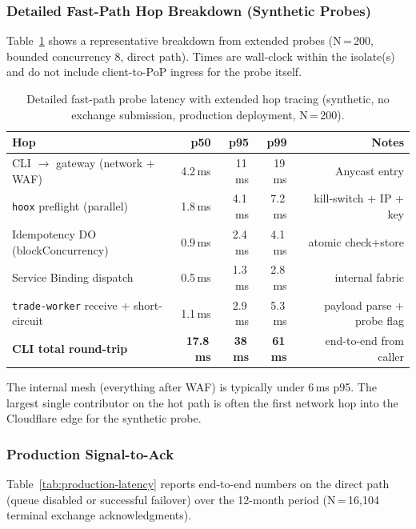 \subsubsection{Detailed Fast-Path Hop Breakdown (Synthetic Probes)}

Table~\ref{tab:fastpath-detailed} shows a representative breakdown from extended probes (N\,=\,200, bounded concurrency 8, direct path). Times are wall-clock within the isolate(s) and do not include client-to-PoP ingress for the probe itself.

\begin{table}[t]
  \centering
  \caption{Detailed fast-path probe latency with extended hop tracing (synthetic, no exchange submission, production deployment, N\,=\,200).}
  \label{tab:fastpath-detailed}
  \small
  \begin{tabular*}{\linewidth}{@{\extracolsep{\fill}}lrrrr@{}}
    \toprule
    \textbf{Hop} & \textbf{p50} & \textbf{p95} & \textbf{p99} & \textbf{Notes} \\
    \midrule
    CLI $\to$ gateway (network + WAF) & 4.2\,ms & 11\,ms & 19\,ms & Anycast entry \\
    \texttt{hoox} preflight (parallel) & 1.8\,ms & 4.1\,ms & 7.2\,ms & kill-switch + IP + key \\
    Idempotency DO (blockConcurrency) & 0.9\,ms & 2.4\,ms & 4.1\,ms & atomic check+store \\
    Service Binding dispatch & 0.5\,ms & 1.3\,ms & 2.8\,ms & internal fabric \\
    \texttt{trade-worker} receive + short-circuit & 1.1\,ms & 2.9\,ms & 5.3\,ms & payload parse + probe flag \\
    \textbf{CLI total round-trip} & \textbf{17.8\,ms} & \textbf{38\,ms} & \textbf{61\,ms} & end-to-end from caller \\
    \bottomrule
  \end{tabular*}
\end{table}

The internal mesh (everything after WAF) is typically under 6\,ms p95. The largest single contributor on the hot path is often the first network hop into the Cloudflare edge for the synthetic probe.

\subsubsection{Production Signal-to-Ack}

Table~\ref{tab:production-latency} reports end-to-end numbers on the direct path (queue disabled or successful failover) over the 12-month period (N\,=\,16{,}104 terminal exchange acknowledgments).

